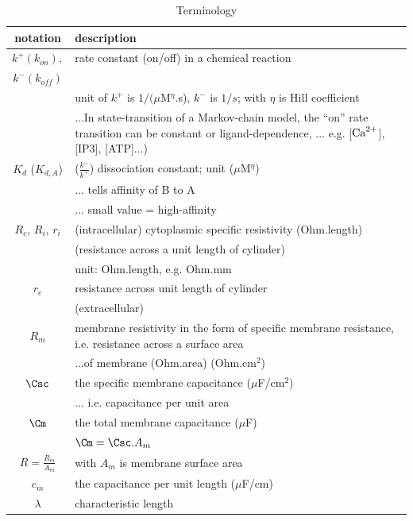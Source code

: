 \def\lsbracket{{\text{[]}}}
 \begin{table}[!hbt]
  \begin{center}
    \caption{Terminology}
    \begin{tabular}{cp{9cm}}
      \hline
      notation& description \\
      \hline\hline
      $k^+ (k_{on}),$ & rate constant (on/off) in a chemical reaction
      \\
      $k^- (k_{off})$      & 
       \ce{A + B <=>[k^+\ce{[A]^\eta}][k^-]AB}  \\
      & unit of $k^+$ is $1/(\mu$M$^\eta$.s), $k^-$ is $1/s$; with
      $\eta$ is Hill coefficient \\
      & ...In state-transition of a Markov-chain model, the ``on''
      rate transition can be constant or ligand-dependence, 
      ... e.g. [${\text{Ca}^{2+}}$], [IP3], [ATP]...)\\
      $K_{d}$ ($K_{d,A}$) & ($\frac{k^-}{k^+}$) dissociation constant;
      unit ($\mu$M$^\eta$)\\
      & ... tells affinity of B to A\\
      & ... small value = high-affinity \\
      $R_c$, $R_i$, $r_i$ & (intracellular) cytoplasmic specific resistivity
      (Ohm.length)\\
          & (resistance across a unit length of cylinder)
      \\
      & unit: Ohm.length, e.g. Ohm.mm \\
      $r_e$ &  resistance across unit length of cylinder \\
      &  (extracellular) \\
      $R_m$ & membrane resistivity in the form of specific membrane resistance,
      i.e.      resistance across a surface area\\
      & ...of membrane (Ohm.area) (Ohm.cm$^2$)\\
      $\Csc$ & the specific membrane capacitance ($\mu$F/cm$^2$) \\
      & ... i.e.  capacitance per unit area \\
      $\Cm$ & the total membrane capacitance ($\mu$F) \\
      & $\Cm=\Csc.A_m$ \\
      $R=\frac{R_m}{A_m}$ & with $A_m$ is membrane surface area \\
      $c_m$ & the capacitance per unit length ($\mu$F/cm) \\
      $\lambda$ & characteristic length \\
    \end{tabular}
  \end{center}
  \label{tab:terminology_11}
\end{table}

